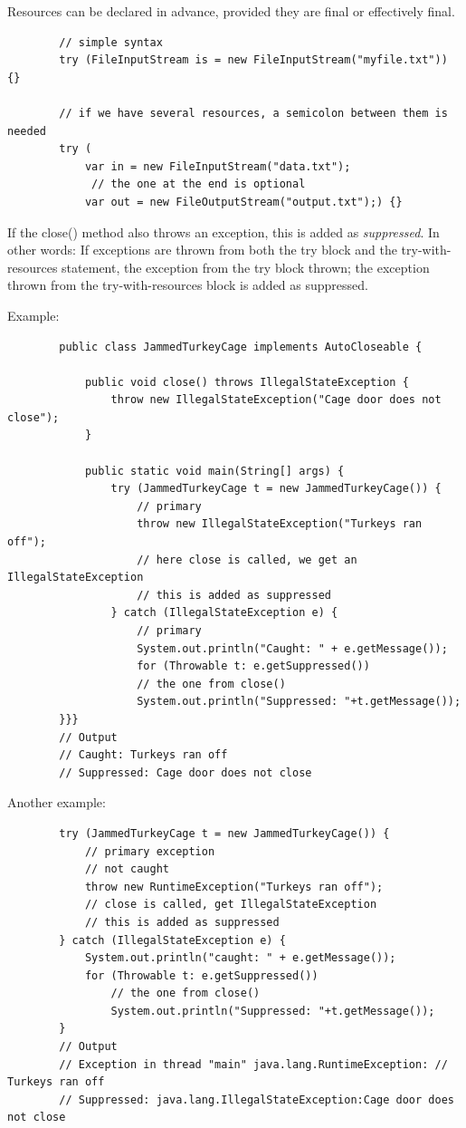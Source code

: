 \documentclass{scrartcl}
\begin{document}
    Resources can be declared in advance, provided they are final or effectively final.

    \begin{lstlisting}
        // simple syntax
        try (FileInputStream is = new FileInputStream("myfile.txt")) {}

        // if we have several resources, a semicolon between them is needed
        try (
            var in = new FileInputStream("data.txt");
             // the one at the end is optional
            var out = new FileOutputStream("output.txt");) {}
    \end{lstlisting}

    If the close() method also throws an exception, this is added as \textit{suppressed}. In other words: If exceptions are thrown from both the try block and the try-with-resources statement,
    the exception from the try block thrown; the exception thrown from the try-with-resources block is added as suppressed.

    Example:
    \begin{lstlisting}
        public class JammedTurkeyCage implements AutoCloseable {

            public void close() throws IllegalStateException {
                throw new IllegalStateException("Cage door does not close");
            }

            public static void main(String[] args) {
                try (JammedTurkeyCage t = new JammedTurkeyCage()) {
                    // primary
                    throw new IllegalStateException("Turkeys ran off");
                    // here close is called, we get an IllegalStateException
                    // this is added as suppressed
                } catch (IllegalStateException e) {
                    // primary
                    System.out.println("Caught: " + e.getMessage());
                    for (Throwable t: e.getSuppressed())
                    // the one from close()
                    System.out.println("Suppressed: "+t.getMessage());
        }}}
        // Output
        // Caught: Turkeys ran off
        // Suppressed: Cage door does not close
    \end{lstlisting}

    Another example:
    \begin{lstlisting}
        try (JammedTurkeyCage t = new JammedTurkeyCage()) {
            // primary exception
            // not caught
            throw new RuntimeException("Turkeys ran off");
            // close is called, get IllegalStateException
            // this is added as suppressed
        } catch (IllegalStateException e) {
            System.out.println("caught: " + e.getMessage());
            for (Throwable t: e.getSuppressed())
                // the one from close()
                System.out.println("Suppressed: "+t.getMessage());
        }
        // Output
        // Exception in thread "main" java.lang.RuntimeException: // Turkeys ran off
        // Suppressed: java.lang.IllegalStateException:Cage door does not close
    \end{lstlisting}
\end{document}
